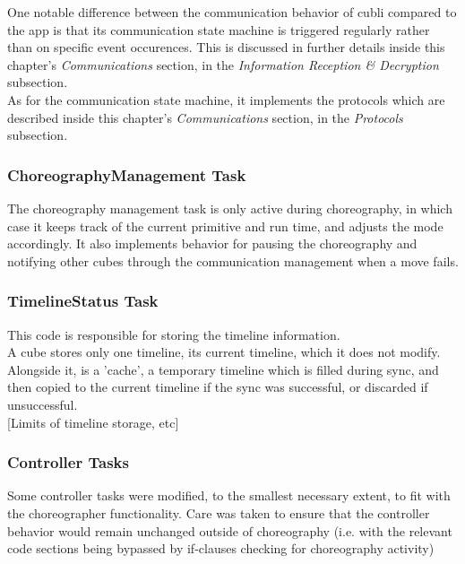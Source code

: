 One notable difference between the communication behavior of cubli compared to the app is that its communication state machine is triggered regularly rather than on specific event occurences. This is discussed in further details inside this chapter's \textit{Communications} section, in the \textit{Information Reception \& Decryption} subsection.\\ 

As for the communication state machine, it implements the protocols which are described inside this chapter's \textit{Communications} section, in the \textit{Protocols} subsection. 

\subsubsection{ChoreographyManagement Task}

The choreography management task is only active during choreography, in which case it keeps track of the current primitive and run time, and adjusts the mode accordingly. It also implements behavior for pausing the choreography and notifying other cubes through the communication management when a move fails.

\subsubsection{TimelineStatus Task}

This code is responsible for storing the timeline information.\\

A cube stores only one timeline, its current timeline, which it does not modify. Alongside it, is a 'cache', a temporary timeline which is filled during sync, and then copied to the current timeline if the sync was successful, or discarded if unsuccessful.\\

[Limits of timeline storage, etc]

\subsubsection{Controller Tasks}

Some controller tasks were modified, to the smallest necessary extent, to fit with the choreographer functionality. Care was taken to ensure that the controller behavior would remain unchanged outside of choreography (i.e. with the relevant code sections being bypassed by if-clauses checking for choreography activity)

